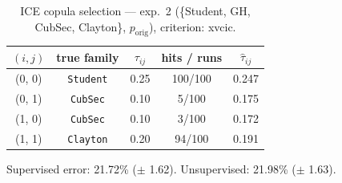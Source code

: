 \begin{table}[htbp]
  \centering
  \caption{ICE copula selection — exp.\ 2 (\{Student, GH, CubSec, Clayton\}, $p_{\text{orig}}$), criterion: xvcic.}
  \label{tab:exp3-exp2_orig_p__xvcic}
  \begin{tabular}{ccccc}
    \toprule
    $(i, j)$ & true family & $\tau_{ij}$ & hits / runs & $\hat\tau_{ij}$ \\
    \midrule
    (0, 0) & \texttt{Student} & 0.25 & 100/100 & 0.247 \\
    (0, 1) & \texttt{CubSec} & 0.10 & 5/100 & 0.175 \\
    (1, 0) & \texttt{CubSec} & 0.10 & 3/100 & 0.172 \\
    (1, 1) & \texttt{Clayton} & 0.20 & 94/100 & 0.191 \\
    \bottomrule
  \end{tabular}
  \par\smallskip Supervised error: 21.72\% ($\pm$ 1.62). Unsupervised: 21.98\% ($\pm$ 1.63).
\end{table}

